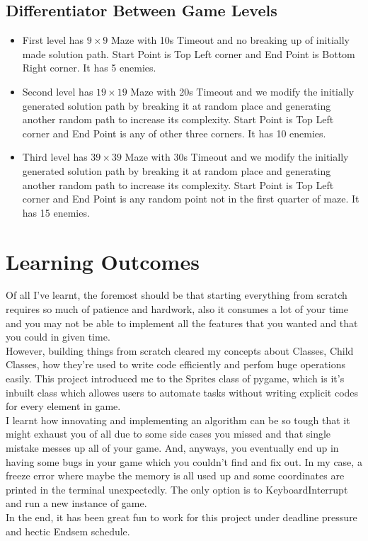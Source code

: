 \documentclass{article}
\begin{document}
\subsection*{Differentiator Between Game Levels}
\begin{itemize}
    \item First level has $9\times9$ Maze with 10s Timeout and no breaking up of initially made solution path. Start Point is Top Left corner and End Point is Bottom Right corner. It has 5 enemies.
    \item Second level has $19\times19$ Maze with 20s Timeout and we modify the initially generated solution path by breaking it at random place and generating another random path to increase its complexity. Start Point is Top Left corner and End Point is any of other three corners. It has 10 enemies.
    \item Third level has $39\times39$ Maze with 30s Timeout and we modify the initially generated solution path by breaking it at random place and generating another random path to increase its complexity. Start Point is Top Left corner and End Point is any random point not in the first quarter of maze. It has 15 enemies.
\end{itemize}

\section{Learning Outcomes}
Of all I've learnt, the foremost should be that starting everything from scratch requires so much of patience and hardwork, also it consumes a lot of your time and you may not be able to implement all the features that you wanted and that you could in given time.\\
However, building things from scratch cleared my concepts about Classes, Child Classes, how they're used to write code efficiently and perfom huge operations easily. This project introduced me to the Sprites class of pygame, which is it's inbuilt class which allowes users to automate tasks without writing explicit codes for every element in game.\\
I learnt how innovating and implementing an algorithm can be so tough that it might exhaust you of all due to some side cases you missed and that single mistake messes up all of your game. And, anyways, you eventually end up in having some bugs in your game which you couldn't find and fix out. In my case, a freeze error where maybe the memory is all used up and some coordinates are printed in the terminal unexpectedly. The only option is to KeyboardInterrupt and run a new instance of game.\\
In the end, it has been great fun to work for this project under deadline pressure and hectic Endsem schedule.
\end{document}
